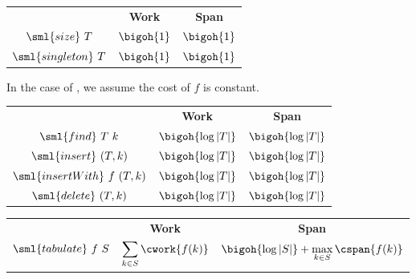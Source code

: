 \begin{cluster}
\label{grp:cst:treap-table::constant-work-operations}

\begin{costspec}
\label{cst:treap-table::constant-work-operations}
\begin{tabular}{c|c|c}
& \textbf{Work} & \textbf{Span} \\
$\sml{size}~T$ & $\bigoh{1}$ & $\bigoh{1}$ \\
$\sml{singleton}~T$ & $\bigoh{1}$ & $\bigoh{1}$ \\
\end{tabular}

\end{costspec}
\end{cluster}

\begin{cluster}
\label{grp:cst:treap-table::single-element-operations}

\begin{costspec}
\label{cst:treap-table::single-element-operations}
In the case of , we assume the cost of $f$ is constant.
\begin{tabular}{c|c|c}
& \textbf{Work} & \textbf{Span} \\
$\sml{find}~T~k$ & $\bigoh{\log|T|}$ & $\bigoh{\log|T|}$ \\
$\sml{insert}~(T, k)$ & $\bigoh{\log|T|}$ & $\bigoh{\log|T|}$ \\
$\sml{insertWith}~f~(T, k)$ & $\bigoh{\log|T|}$ & $\bigoh{\log|T|}$ \\
$\sml{delete}~(T, k)$ & $\bigoh{\log|T|}$ & $\bigoh{\log|T|}$
\end{tabular}

\end{costspec}
\end{cluster}

\begin{cluster}
\label{grp:cst:treap-table::tabulate}

\begin{costspec}[Tabulate]
\label{cst:treap-table::tabulate}
\begin{tabular}{c|c|c}
& \textbf{Work} & \textbf{Span} \\
$\sml{tabulate}~f~S$ &
$\displaystyle\sum_{k \in S} \cwork {f(k)}$ &
$\bigoh{\log|S|} + \displaystyle\max_{k \in S} \cspan{f(k)}$
\end{tabular}

\end{costspec}
\end{cluster}

